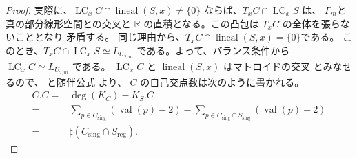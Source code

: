 \documentclass[a4paper,dvipdfmx,reqno,12pt]{amsart}
\theoremstyle{definition}
\newcommand{\opn}[1]{\operatorname{#1}}
\numberwithin{equation}{section}
\begin{document}
\begin{proof}
実際に、$\opn{LC}_x C\cap \opn{lineal}(S,x)\ne \{0\}$
ならば、$T_x C \cap \opn{LC}_x S$ は、
$\Gamma_m$と真の部分線形空間との交叉と $\mathbb{R}$
の直積となる。この凸包は $T_x C$ の全体を張らないこととなり
矛盾する。
同じ理由から、$T_x C\cap \opn{lineal}(S,x)=\{0\}$である。
このとき、$T_x C\cap \opn{LC}_x S\simeq L_{U_{2,m}}$
である。よって、バランス条件から
$\opn{LC}_x C\simeq L_{U_{2,m}}$ である。
$\opn{LC}_x C$ と $\opn{lineal}(S,x)$ はマトロイドの交叉
とみなせるので、\cite[Theorem 4.2]{MR3032930}
と随伴公式\cite[Theorem 4.11]{shaw2015tropical} より、
$C$ の自己交点数は次のように書かれる。
\begin{align}
C . C=&\opn{deg}(K_C)-K_S . C \\
=& \sum_{p\in C_{\mathrm{sing}}}(\opn{val}(p)-2)
- \sum_{p\in C_{\mathrm{sing}}\cap S_{\mathrm{sing}}}
(\opn{val}(p)-2) \\
=& \sharp (C_{\mathrm{sing}}\cap S_{\mathrm{reg}}).
\end{align}

\end{proof}
\end{document}
